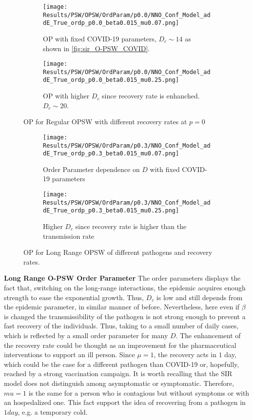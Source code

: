 \documentclass[a4paper,10pt,twoside]{book} %
\theoremstyle{definition}
\begin{document}
\begin{figure}[t]
	\begin{subfigure}{0.48\linewidth}
		\centering
		\texttt{[image: Results/PSW/OPSW/OrdParam/p0.0/NNO\_Conf\_Model\_addE\_True\_ordp\_p0.0\_beta0.015\_mu0.07.png]} 
		\caption{OP with fixed COVID-19 parameters, $D_c \sim 14$ as shown in \autoref{fig:sir_O-PSW_COVID}.}
		\label{fig:Ordp_OPSW_COVID-19}
	\end{subfigure}
	\begin{subfigure}{0.48\linewidth}
		\centering
		\texttt{[image: Results/PSW/OPSW/OrdParam/p0.0/NNO\_Conf\_Model\_addE\_True\_ordp\_p0.0\_beta0.015\_mu0.25.png]}
		\caption{OP with higher $D_c$ since recovery rate is enhanched. $D_c \sim 20$.}
		\label{fig:Ordp_OPSW_highmu_COVID19}
	\end{subfigure}
	\caption{OP for Regular OPSW with different recovery rates at $p = 0$ }
\end{figure}

\begin{figure}[t]
	\begin{subfigure}{0.48\linewidth}
		\texttt{[image: Results/PSW/OPSW/OrdParam/p0.3/NNO\_Conf\_Model\_addE\_True\_ordp\_p0.3\_beta0.015\_mu0.07.png]}
		\caption{Order Parameter dependence on $D$ with fixed COVID-19 parameters}
		\label{fig:Ordp_OPSW_COVID-19_p0.3}
	\end{subfigure}
	\begin{subfigure}{0.48\linewidth}
		\texttt{[image: Results/PSW/OPSW/OrdParam/p0.3/NNO\_Conf\_Model\_addE\_True\_ordp\_p0.3\_beta0.015\_mu0.25.png]}
		\caption{Higher $D_c$ since recovery rate is higher than the transmission rate}
		\label{fig:Ordp_OPSW_highmu_p0.3}
	\end{subfigure}
	\caption{OP for Long Range OPSW of different pathogens and recovery rates.}
\end{figure}

\textbf{Long Range O-PSW Order Parameter}
The order parameters displays the fact that, switching on the long-range interactions, the epidemic acquires enough strength to ease the exponential growth. Thus, $D_c$ is low and still depends from the epidemic parameter, in similar manner of before. Nevertheless, here even if $\beta$ is changed the transmissibility of the pathogen is not strong enough to prevent a fast recovery of the individuals. Thus, taking to a small number of daily cases, which is reflected by a small order parameter for many $D$.
The enhancement of the recovery rate could be thought as an improvement for the pharmaceutical interventions to support an ill person. Since $ \mu = 1$, the recovery acts in $1$ day, which could be the case for a different pathogen than COVID-19 or, hopefully, reached by a strong vaccination campaign. It is worth recalling that the SIR model does not distinguish among asymptomatic or symptomatic. Therefore, $mu = 1$ is the same for a person who is contagious but without symptoms or with an hospedalized one. This fact support the idea of recovering from a pathogen in $1 day$, e.g. a temporary cold. 
\end{document}
